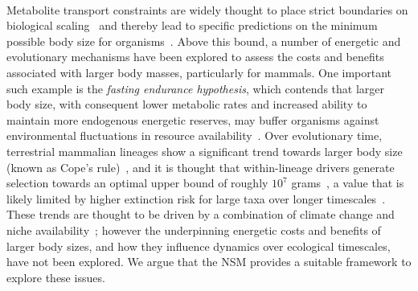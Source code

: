\documentclass{pnastwo}
\begin{document}
\begin{article}
 \\
Metabolite transport constraints are widely thought to place strict boundaries on biological scaling~\cite{Brown:1993p708,West:1997cg,Brown:2004wq} and thereby lead to specific predictions on the minimum possible body size for organisms~\cite{West:2002ud}.
Above this bound, a number of energetic and evolutionary mechanisms have been explored to assess the costs and benefits associated with larger body masses, particularly for mammals.
One important such example is the \emph{fasting endurance hypothesis}, which contends that larger body size, with consequent lower metabolic rates and increased ability to maintain more endogenous energetic reserves, may buffer organisms against environmental fluctuations in resource availability~\cite{Millar:1990p923}.
Over evolutionary time, terrestrial mammalian lineages show a significant trend towards larger body size (known as Cope's rule)~\cite{Alroy:1998p1594,Clauset:2009fh,Smith:2010p3442,Saarinen:2014br}, and it is thought that within-lineage drivers generate selection towards an optimal upper bound of roughly $10^7$ grams~\cite{Alroy:1998p1594}, a value that is likely limited by higher extinction risk for large taxa over longer timescales~\cite{Clauset:2009fh}.
These trends are thought to be driven by a combination of climate change and niche availability~\cite{Saarinen:2014br}; however the underpinning energetic costs and benefits of larger body sizes, and how they influence dynamics over ecological timescales, have not been explored.
We argue that the NSM provides a suitable framework to explore these issues.


\end{article}
\end{document}
